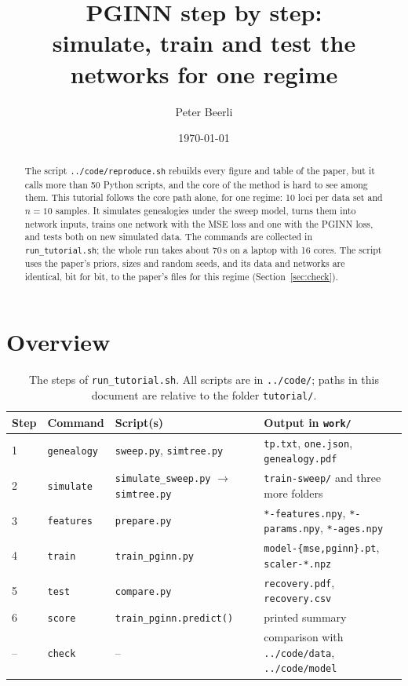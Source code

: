 \documentclass[11pt]{article}
\title{\textbf{PGINN step by step:\\simulate, train and test the networks for one regime}}
\author{Peter Beerli}
\date{\today}
\newcommand{\file}[1]{\texttt{#1}}
\newcommand{\pginn}{PGINN\xspace}
\begin{document}
\maketitle

\begin{abstract}
The script \file{../code/reproduce.sh} rebuilds every figure and table of
the paper, but it calls more than 50 Python scripts, and the core of the
method is hard to see among them. This tutorial follows the core path
alone, for one regime: 10 loci per data set and $n{=}10$ samples. It
simulates genealogies under the sweep model, turns them into network
inputs, trains one network with the MSE loss and one with the \pginn
loss, and tests both on new simulated data. The commands are collected
in \file{run\_tutorial.sh}; the whole run takes about
70\,s on a laptop with 16 cores. The script uses the paper's priors,
sizes and random seeds, and its data and networks are identical, bit for
bit, to the paper's files for this regime (Section~\ref{sec:check}).
\end{abstract}

\tableofcontents

\section{Overview}\label{sec:overview}

\begin{table}[h]
\centering
\small
\begin{tabular}{@{}llll@{}}
\toprule
Step & Command & Script(s) & Output in \file{work/} \\
\midrule
1 & \file{genealogy} & \file{sweep.py}, \file{simtree.py} & \file{tp.txt}, \file{one.json}, \file{genealogy.pdf}\\
2 & \file{simulate}  & \file{simulate\_sweep.py} $\to$ \file{simtree.py} & \file{train-sweep/} and three more folders \\
3 & \file{features}  & \file{prepare.py} & \file{*-features.npy}, \file{*-params.npy}, \file{*-ages.npy} \\
4 & \file{train}     & \file{train\_pginn.py} & \file{model-\{mse,pginn\}.pt}, \file{scaler-*.npz} \\
5 & \file{test}      & \file{compare.py} & \file{recovery.pdf}, \file{recovery.csv} \\
6 & \file{score}     & \file{train\_pginn.predict()} & printed summary \\
-- & \file{check}    & -- & comparison with \file{../code/data}, \file{../code/model} \\
\bottomrule
\end{tabular}
\caption{The steps of \file{run\_tutorial.sh}. All scripts are in
\file{../code/}; paths in this document are relative to the folder \file{tutorial/}.}
\label{tab:steps}
\end{table}
\end{document}
